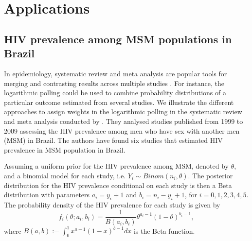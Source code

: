 \documentclass[a4paper, notitlepage, 10pt]{article}
\begin{document}
\section{Applications}
\label{sec:apps}

\subsection{HIV prevalence among MSM populations in Brazil}
\label{sec:metaAnalysis}

In epidemiology, systematic review and meta analysis are popular tools for merging and contrasting results across multiple studies \citep[Chapter 33]{Rothman2008}. 
For instance, the logarithmic polling could be used to combine probability distributions of a particular outcome estimated from several studies. 
We illustrate the different approaches to assign weights in the logarithmic polling in the systematic review and meta analysis conducted by \citet{malta2010hiv}. 
They analysed studies published from 1999 to 2009 assessing the HIV prevalence among men who have sex with another men (MSM) in Brazil. 
The authors have found six studies that estimated HIV prevalence in MSM population in Brazil. 

Assuming a uniform prior for the HIV prevalence among MSM, denoted by $\theta$, and a binomial model for each study, i.e. $Y_i \sim Binom(n_i, \theta)$. 
The posterior distribution for the HIV prevalence conditional on each study is then a Beta distribution with parameters $a_i = y_i + 1$ and $b_i = n_i - y_i + 1$, for $i=0,1,2,3,4,5$. 
The probability density of the HIV prevalence for each study is given by
$$f_i(\theta;a_i, b_i) = \frac{1}{B(a_i, b_i)} \theta^{a_i-1}(1-\theta)^{b_i-1},$$
where $B(a,b) := \int_{0}^{1} x^{a-1}(1-x)^{b-1}dx$ is the Beta function.
\end{document}

